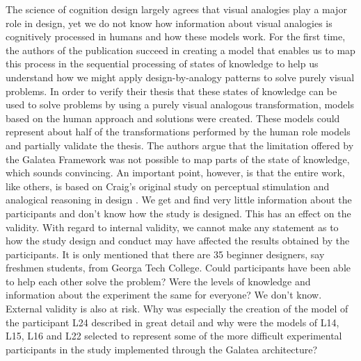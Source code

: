 \documentclass[12pt]{article}
\begin{document}
The science of cognition design largely agrees that visual analogies play a major role in design, yet we do not know how information about visual analogies is cognitively processed in humans and how these models work. For the first time, the authors of the publication succeed in creating a model that enables us to map this process in the sequential processing of states of knowledge to help us understand how we might apply design-by-analogy patterns to solve purely visual problems. In order to verify their thesis that these states of knowledge can be used to solve problems by using a purely visual analogous transformation, models based on the human approach and solutions were created. These models could represent about half of the transformations performed by the human role models and partially validate the thesis. The authors argue that the limitation offered by the Galatea Framework was not possible to map parts of the state of knowledge, which sounds convincing. An important point, however, is that the entire work, like others, is based on Craig's original study on perceptual stimulation and analogical reasoning in design \cite{craig2001perceptual}. We get and find very little information about the participants and don't know how the study is designed. This has an effect on the validity. With regard to internal validity, we cannot make any statement as to how the study design and conduct may have affected the results obtained by the participants. It is only mentioned that there are 35 beginner designers, say freshmen students, from Georga Tech College. Could participants have been able to help each other solve the problem? Were the levels of knowledge and information about the experiment the same for everyone? We don't know. External validity is also at risk. 
Why was especially the creation of the model of the participant L24 described in great detail and why were the models of L14, L15, L16 and L22 selected to represent some of the more difficult experimental participants in the study implemented through the Galatea architecture? 


\noindent




\end{document}
